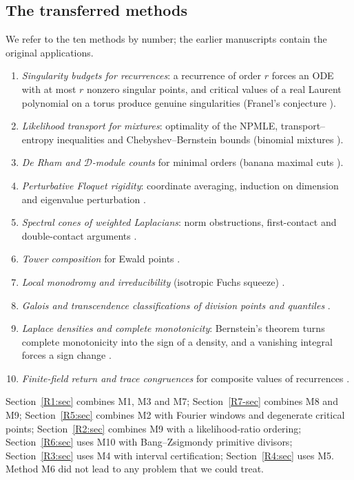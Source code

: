 \documentclass[11pt]{amsart}
\theoremstyle{definition}
\theoremstyle{remark}
\begin{document}
\subsection{The transferred methods}
We refer to the ten methods by number; the earlier manuscripts contain the
original applications.
\begin{enumerate}
\item[M1.] \emph{Singularity budgets for recurrences}: a recurrence of
order $r$ forces an ODE with at most $r$ nonzero singular points, and
critical values of a real Laurent polynomial on a torus produce genuine
singularities (Franel's conjecture \cite{K-006,K-034}).
\item[M2.] \emph{Likelihood transport for mixtures}: optimality of the
NPMLE, transport--entropy inequalities and Chebyshev--Bernstein bounds
(binomial mixtures \cite{K-029}).
\item[M3.] \emph{De Rham and $\mathcal D$-module counts} for minimal
orders (banana maximal cuts \cite{K-032}).
\item[M4.] \emph{Perturbative Floquet rigidity}: coordinate averaging,
induction on dimension and eigenvalue perturbation \cite{K-034}.
\item[M5.] \emph{Spectral cones of weighted Laplacians}: norm
obstructions, first-contact and double-contact arguments \cite{K-015}.
\item[M6.] \emph{Tower composition} for Ewald points \cite{K-041}.
\item[M7.] \emph{Local monodromy and irreducibility} (isotropic Fuchs
squeeze) \cite{K-037}.
\item[M8.] \emph{Galois and transcendence classifications of division
points and quantiles} \cite{K-024}.
\item[M9.] \emph{Laplace densities and complete monotonicity}: Bernstein's
theorem turns complete monotonicity into the sign of a density, and a
vanishing integral forces a sign change \cite[Part~VIII]{K-033}.
\item[M10.] \emph{Finite-field return and trace congruences} for composite
values of recurrences \cite{K-007}.
\end{enumerate}
Section~\ref{R1:sec} combines M1, M3 and M7; Section~\ref{R7-sec} combines
M8 and M9; Section~\ref{R5:sec} combines M2 with Fourier windows and
degenerate critical points; Section~\ref{R2:sec} combines M9 with a
likelihood-ratio ordering; Section~\ref{R6:sec} uses M10 with
Bang--Zsigmondy primitive divisors; Section~\ref{R3:sec} uses M4 with
interval certification; Section~\ref{R4:sec} uses M5. Method M6 did not
lead to any problem that we could treat.
\end{document}
